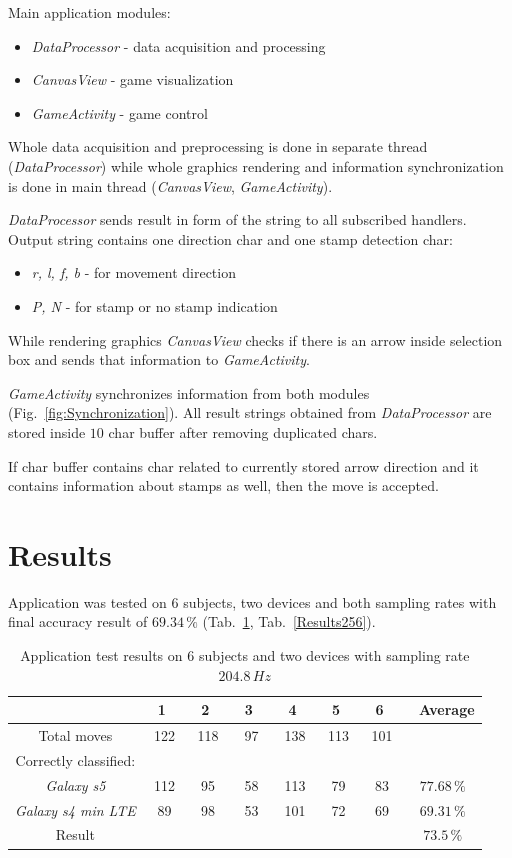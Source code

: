 \documentclass[conference]{IEEEtran}
\begin{document}
Main application modules:
\begin{itemize}
    \item \emph{DataProcessor} - data acquisition and processing
    \item \emph{CanvasView} - game visualization
    \item \emph{GameActivity} - game control
\end{itemize}

Whole data acquisition and preprocessing is done in separate thread (\emph{DataProcessor}) while whole graphics rendering and information synchronization is done in main thread (\emph{CanvasView}, \emph{GameActivity}).

\emph{DataProcessor} sends result in form of the string to all subscribed handlers. Output string contains one direction char and one stamp detection char:
\begin{itemize}
    \item \emph{r, l, f, b} - for movement direction
    \item \emph{P, N} - for stamp or no stamp indication
\end{itemize}

While rendering graphics \emph{CanvasView} checks if there is an arrow inside selection box and sends that information to \emph{GameActivity}.

\emph{GameActivity} synchronizes information from both modules (Fig.~\ref{fig:Synchronization}).
All result strings obtained from \emph{DataProcessor} are stored inside $10$ char buffer after removing duplicated chars.

If char buffer contains char related to currently stored arrow direction and it contains information about stamps as well, then the move is accepted.

\section{Results}

Application was tested on 6 subjects, two devices and both sampling rates with final accuracy result of $69.34\,\%$ (Tab.~\ref{Results204}, Tab.~\ref{Results256}).

\begin{table}[h!]
	\caption{Application test results on 6 subjects and two devices with sampling rate $204.8\,Hz$}
	\begin{center}
		\begin{tabular}{c|cccccc|c}
			& \ 1 \ &\ 2 \ &\ 3 \ &\ 4 \ &\ 5 \ &\ 6 \ &\ Average\\
			\hline
			Total moves&122&118&97&138&113&101\\
			\hline
			Correctly classified:&&&&&&\\
			\emph{Galaxy s5}&112&95&58&113&79&83&$77.68\,\%$\\
			\emph{Galaxy s4 min LTE}&89&98&53&101&72&69&$69.31\,\%$\\
			\hline
		    Result&&&&&&&$73.5\,\%$
		\end{tabular}
		\label{Results204}
	\end{center}
\end{table}
\end{document}
